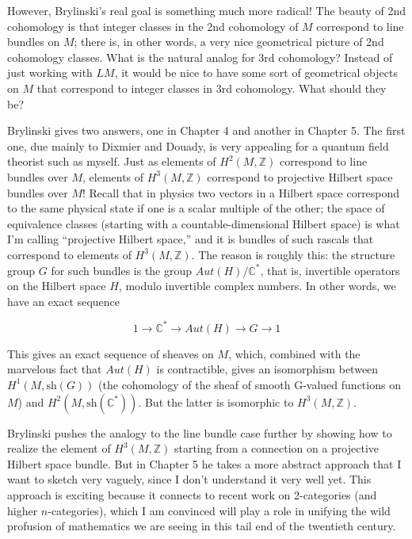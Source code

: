 \documentclass{article}
\begin{document}
However, Brylinski's real goal is something much more radical! The
beauty of 2nd cohomology is that integer classes in the 2nd cohomology
of \(M\) correspond to line bundles on \(M\); there is, in other words,
a very nice geometrical picture of 2nd cohomology classes. What is the
natural analog for 3rd cohomology? Instead of just working with \(LM\),
it would be nice to have some sort of geometrical objects on \(M\) that
correspond to integer classes in 3rd cohomology. What should they be?

Brylinski gives two answers, one in Chapter 4 and another in Chapter 5.
The first one, due mainly to Dixmier and Douady, is very appealing for a
quantum field theorist such as myself. Just as elements of
\(H^2(M,\mathbb{Z})\) correspond to line bundles over \(M\), elements of
\(H^3(M,\mathbb{Z})\) correspond to projective Hilbert space bundles
over \(M\)! Recall that in physics two vectors in a Hilbert space
correspond to the same physical state if one is a scalar multiple of the
other; the space of equivalence classes (starting with a
countable-dimensional Hilbert space) is what I'm calling ``projective
Hilbert space,'' and it is bundles of such rascals that correspond to
elements of \(H^3(M,\mathbb{Z})\). The reason is roughly this: the
structure group \(G\) for such bundles is the group
\(Aut(H)/\mathbb{C}^*\), that is, invertible operators on the Hilbert
space \(H\), modulo invertible complex numbers. In other words, we have
an exact sequence

\[1 \to \mathbb{C}^* \to Aut(H) \to G \to 1\]

This gives an exact sequence of sheaves on \(M\), which, combined with
the marvelous fact that \(Aut(H)\) is contractible, gives an isomorphism
between \(H^1(M,\mathrm{sh}(G))\) (the cohomology of the sheaf of smooth
G-valued functions on \(M\)) and \(H^2(M,\mathrm{sh}(\mathbb{C}^*))\).
But the latter is isomorphic to \(H^3(M,\mathbb{Z})\).

Brylinski pushes the analogy to the line bundle case further by showing
how to realize the element of \(H^3(M,\mathbb{Z})\) starting from a
connection on a projective Hilbert space bundle. But in Chapter 5 he
takes a more abstract approach that I want to sketch very vaguely, since
I don't understand it very well yet. This approach is exciting because
it connects to recent work on 2-categories (and higher
\(n\)-categories), which I am convinced will play a role in unifying the
wild profusion of mathematics we are seeing in this tail end of the
twentieth century.
\end{document}
